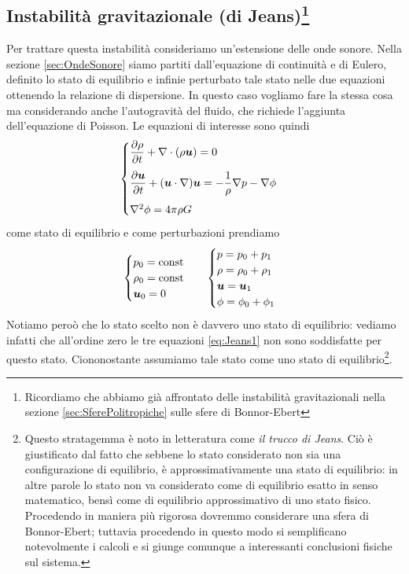 \subsection[Instabilità gravitazionale (di Jeans)]{Instabilità gravitazionale (di Jeans)\footnote{Ricordiamo che abbiamo già affrontato delle instabilità gravitazionali nella sezione \ref{sec:SferePolitropiche} sulle sfere di Bonnor-Ebert}}
Per trattare questa instabilità consideriamo un'estensione delle onde sonore. Nella sezione \ref{sec:OndeSonore} siamo partiti dall'equazione di continuità e di Eulero, definito lo stato di equilibrio e infinie perturbato tale stato nelle due equazioni ottenendo la relazione di dispersione. In questo caso vogliamo fare la stessa cosa ma considerando anche l'autogravità del fluido, che richiede l'aggiunta dell'equazione di Poisson. Le equazioni di interesse sono quindi
\begin{equation} \label{eq:Jeans1}
\begin{cases}
\derP{\rho}{t} + \Div (\rho\V{u}) = 0 \\[10pt]
\derP{\V{u}}{t} + (\scal{u}{\nabla})\V{u} = -\inv{\rho} \V{\nabla}p - \V{\nabla}\phi \\[10pt]
\nabla^2 \phi = 4 \pi \rho G
\end{cases}
\end{equation}
come stato di equilibrio e come perturbazioni prendiamo
\begin{align} \label{eq:Jeans2}
&\begin{cases}
p_0 = \mathrm{const} \\
\rho_0 = \mathrm{const} \\
\V{u}_0 = 0
\end{cases}
&\begin{cases}
p = p_0 + p_1 \\
\rho = \rho_0 + \rho_1 \\
\V{u} = \V{u}_1 \\
\phi = \phi_0 + \phi_1
\end{cases}
\end{align}
Notiamo peroò che lo stato scelto non è davvero uno stato di equilibrio: vediamo infatti che all'ordine zero le tre equazioni \ref{eq:Jeans1} non sono soddisfatte per questo stato. Ciononostante assumiamo tale stato come uno stato di equilibrio\footnote{Questo stratagemma è noto in letteratura come \textit{il trucco di Jeans}. Ciò è giustificato dal fatto che sebbene lo stato considerato non sia una configurazione di equilibrio, è approssimativamente una stato di equilibrio: in altre parole lo stato non va considerato come di equilibrio esatto in senso matematico, bensì come di equilibrio approssimativo di uno stato fisico. Procedendo in maniera più rigorosa dovremmo considerare una sfera di Bonnor-Ebert; tuttavia procedendo in questo modo si semplificano notevolmente i calcoli e si giunge comunque a interessanti conclusioni fisiche sul sistema.}.
